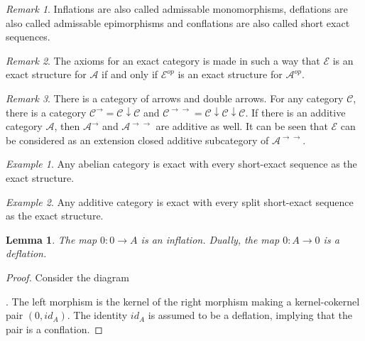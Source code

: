 \documentclass[11pt]{article}
\newtheorem{lemma}[theorem]{Lemma}
\theoremstyle{definition}
\theoremstyle{remark}
\newtheorem*{remark}{Remark}
\newtheorem*{example}{Example}
\begin{document}
            \begin{remark}
                Inflations are also called admissable monomorphisms, deflations are also called admissable epimorphisms and conflations are also called short exact sequences.
            \end{remark}

            \begin{remark}
                The axioms for an exact category is made in such a way that $\mathcal{E}$ is an exact structure for $\mathcal{A}$ if and only if $\mathcal{E}^{op}$ is an exact structure for $\mathcal{A}^{op}$.
            \end{remark}

            \begin{remark}
                There is a category of arrows and double arrows. For any category $\mathcal{C}$, there is a category $\mathcal{C}^{\rightarrow}=\mathcal{C}\downarrow\mathcal{C}$ and $\mathcal{C}^{\rightarrow\rightarrow}=\mathcal{C}\downarrow\mathcal{C}\downarrow\mathcal{C}$. If there is an additive category $\mathcal{A}$, then $\mathcal{A}^{\rightarrow}$ and $\mathcal{A}^{\rightarrow\rightarrow}$ are additive as well. It can be seen that $\mathcal{E}$ can be considered as an extension closed additive subcategory of $\mathcal{A}^{\rightarrow\rightarrow}$.
            \end{remark}

            \begin{example}
                Any abelian category is exact with every short-exact sequence as the exact structure.
            \end{example}

            \begin{example}
                Any additive category is exact with every split short-exact sequence as the exact structure.
            \end{example}

            \begin{lemma}
                The map $0:0\rightarrow A$ is an inflation. Dually, the map $0:A\rightarrow 0$ is a deflation.
            \end{lemma}

            \begin{proof}
                Consider the diagram . The left morphism is the kernel of the right morphism making a kernel-cokernel pair $(0,id_A)$. The identity $id_A$ is assumed to be a deflation, implying that the pair is a conflation.
            \end{proof}
\end{document}
